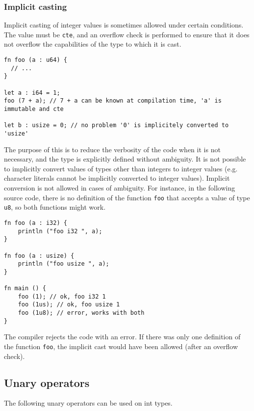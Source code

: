\subsubsection{Implicit casting}

Implicit casting of integer values is sometimes allowed under certain
conditions. The value must be \texttt{cte}, and an overflow check is performed
to ensure that it does not overflow the capabilities of the type to which it is
cast.

  \begin{lstlisting}[style=coloredverbatim]
fn foo (a : u64) {
  // ...
}

let a : i64 = 1;
foo (7 + a); // 7 + a can be known at compilation time, 'a' is immutable and cte

let b : usize = 0; // no problem '0' is implicitely converted to 'usize'
  \end{lstlisting}

The purpose of this is to reduce the verbosity of the code when it is not
necessary, and the type is explicitly defined without ambiguity. It is not
possible to implicitly convert values of types other than integers to integer
values (e.g. character literals cannot be implicitly converted to integer
values). Implicit conversion is not allowed in cases of ambiguity. For instance,
in the following source code, there is no definition of the function
\texttt{foo} that accepts a value of type \texttt{u8}, so both functions might
work.

\begin{lstlisting}[style=coloredverbatim]
fn foo (a : i32) {
    println ("foo i32 ", a);
}

fn foo (a : usize) {
    println ("foo usize ", a);
}

fn main () {
    foo (1); // ok, foo i32 1
    foo (1us); // ok, foo usize 1
    foo (1u8); // error, works with both
}
  \end{lstlisting}

The compiler rejects the code with an error. If there was only one definition of
the function \texttt{foo}, the implicit cast would have been allowed (after an
overflow check).

\subsection{Unary operators}
\label{sec:orge691bb5}

The following unary operators can be used on int types.
\smallskip



